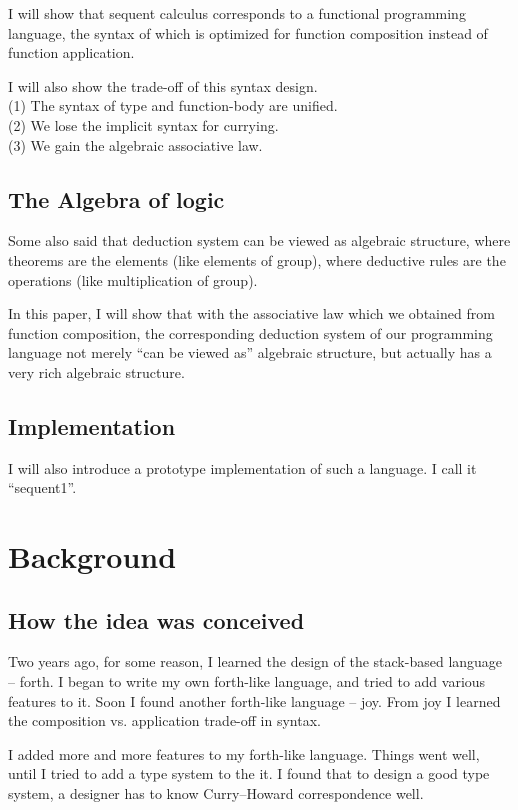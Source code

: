 \documentclass[numbers]{sigplanconf}
\begin{document}
I will show that
sequent calculus corresponds to a functional programming language,
the syntax of which is optimized for function composition
instead of function application.

I will also show the trade-off of this syntax design. \\
(1) The syntax of type and function-body are unified. \\
(2) We lose the implicit syntax for currying. \\
(3) We gain the algebraic associative law.

\subsection{The Algebra of logic}

Some also said that
deduction system can be viewed as algebraic structure,
where theorems are the elements (like elements of group),
where deductive rules are the operations (like multiplication of group). \cite{Hott}

In this paper, I will show that
with the associative law which we obtained from function composition,
the corresponding deduction system of our programming language
not merely ``can be viewed as'' algebraic structure,
but actually has a very rich algebraic structure.

\subsection{Implementation}

I will also introduce a prototype implementation of such a language.
I call it ``sequent1''.

\section{Background}

\subsection{How the idea was conceived}

Two years ago,
for some reason, I learned the design of the stack-based language -- forth.
I began to write my own forth-like language,
and tried to add various features to it.
Soon I found another forth-like language -- joy.
From joy I learned the composition vs. application trade-off in syntax.

I added more and more features to my forth-like language.
Things went well, until I tried to add a type system to the it.
I found that
to design a good type system,
a designer has to know Curry--Howard correspondence well.
\end{document}
